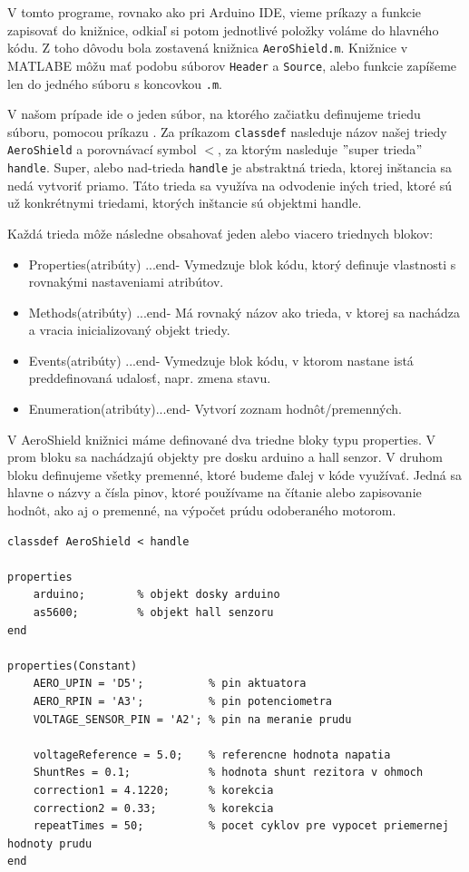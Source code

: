 V tomto programe, rovnako ako pri Arduino IDE, vieme príkazy a funkcie zapisovať do knižnice, odkiaľ si potom jednotlivé položky voláme do hlavného kódu. Z toho dôvodu bola zostavená knižnica \verb|AeroShield.m|. Knižnice v MATLABE môžu mať podobu súborov \verb|Header| a \verb|Source|, alebo funkcie zapíšeme len do jedného súboru s koncovkou \verb|.m|. 

V našom prípade ide o jeden súbor, na ktorého začiatku definujeme triedu súboru, pomocou príkazu . Za príkazom \verb|classdef| nasleduje názov našej triedy \verb|AeroShield| a porovnávací symbol $<$, za ktorým nasleduje $"$super trieda$"$ \verb|handle|. Super, alebo nad-trieda \verb|handle| je abstraktná trieda, ktorej inštancia sa nedá vytvoriť priamo. Táto trieda sa využíva na odvodenie iných tried, ktoré sú už konkrétnymi triedami, ktorých inštancie sú objektmi handle\cite{HANDLE}. 

Každá trieda môže následne obsahovať jeden alebo viacero triednych blokov: 
\begin{itemize}
	\item Properties(atribúty) ...end- Vymedzuje blok kódu, ktorý definuje vlastnosti s rovnakými nastaveniami atribútov.
	\item Methods(atribúty)    ...end- Má rovnaký názov ako trieda, v ktorej sa nachádza a vracia inicializovaný objekt triedy.
	\item Events(atribúty)     ...end- Vymedzuje blok kódu, v ktorom nastane istá preddefinovaná udalosť, napr. zmena stavu. 
	\item Enumeration(atribúty)...end- Vytvorí zoznam hodnôt/premenných. 
\end{itemize}

V AeroShield knižnici máme definované dva triedne bloky typu properties. V prom bloku sa nachádzajú objekty pre dosku arduino a hall senzor. V druhom bloku definujeme všetky premenné, ktoré budeme ďalej v kóde využívať. Jedná sa hlavne o názvy a čísla pinov, ktoré používame na čítanie alebo zapisovanie hodnôt, ako aj o premenné, na výpočet prúdu odoberaného motorom. 

\begin{lstlisting}[caption={Knižnica AeroShield.m properties.},captionpos=b]
classdef AeroShield < handle

properties
	arduino;		% objekt dosky arduino 
	as5600;			% objekt hall senzoru
end

properties(Constant)
	AERO_UPIN = 'D5';          % pin aktuatora 
	AERO_RPIN = 'A3';          % pin potenciometra
	VOLTAGE_SENSOR_PIN = 'A2'; % pin na meranie prudu
	
	voltageReference = 5.0;    % referencne hodnota napatia 
	ShuntRes = 0.1;            % hodnota shunt rezitora v ohmoch
	correction1 = 4.1220;	   % korekcia  				  
	correction2 = 0.33;        % korekcia
	repeatTimes = 50;          % pocet cyklov pre vypocet priemernej hodnoty prudu 
end		
\end{lstlisting}
		
